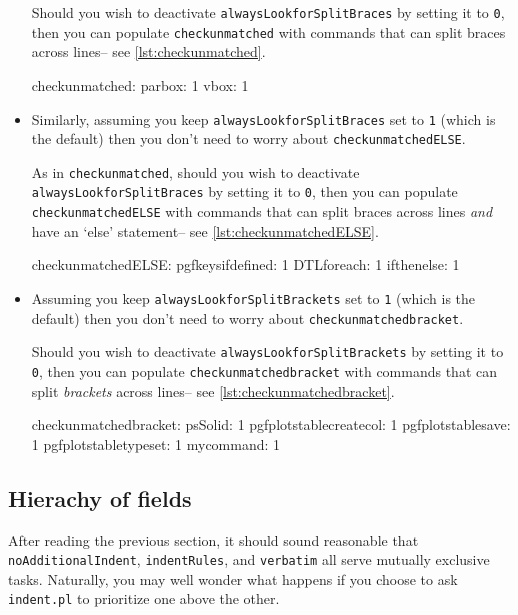 \begin{itemize}
 		Should you wish to deactivate \lstinline!alwaysLookforSplitBraces! by setting it to \lstinline!0!, then 
 		you can populate \lstinline!checkunmatched! with commands that can split braces across 
 		lines-- see \cref{lst:checkunmatched}.
 		 					
 		\begin{yaml}[caption={\lstinline!checkunmatched!},label={lst:checkunmatched}]
checkunmatched:
    parbox: 1
    vbox: 1
 		\end{yaml}
 		\item[\color{red}\verbitem{checkunmatchedELSE}] Similarly, assuming you keep \lstinline!alwaysLookforSplitBraces! set to \lstinline!1! (which
 		is the default) then you don't need to worry about \lstinline!checkunmatchedELSE!. 
 		 					
 		As in \lstinline!checkunmatched!, should you wish to deactivate \lstinline!alwaysLookforSplitBraces! by setting it to \lstinline!0!, then 
 		you can populate \lstinline!checkunmatchedELSE! with commands that can split braces across 
 		lines \emph{and} have an `else' statement-- see \cref{lst:checkunmatchedELSE}.
 		 					
 		\begin{yaml}[caption={\lstinline!checkunmatchedELSE!},label={lst:checkunmatchedELSE}]
checkunmatchedELSE:
    pgfkeysifdefined: 1
    DTLforeach: 1
    ifthenelse: 1
 		\end{yaml}
 		\item[\color{red}\verbitem{checkunmatchedbracket}] Assuming you keep \lstinline!alwaysLookforSplitBrackets! 
 		set to \lstinline!1! (which is the default) then you don't need to worry about \lstinline!checkunmatchedbracket!. 
 		 					
 		Should you wish to deactivate \lstinline!alwaysLookforSplitBrackets! by setting it 
 		to \lstinline!0!, then you can populate \lstinline!checkunmatchedbracket! with commands that can 
 		split \emph{brackets} across lines-- see \cref{lst:checkunmatchedbracket}.
 		 					
 		\begin{yaml}[caption={\lstinline!checkunmatchedbracket!},label={lst:checkunmatchedbracket}]
checkunmatchedbracket:
    psSolid: 1
    pgfplotstablecreatecol: 1
    pgfplotstablesave: 1
    pgfplotstabletypeset: 1
    mycommand: 1
 		\end{yaml}
 	\end{itemize}
 	 	
 \subsection{Hierachy of fields}\label{sec:fieldhierachy}
 	After reading the previous section, it should sound reasonable that 
 	\lstinline!noAdditionalIndent!, \lstinline!indentRules!, and 
 	\lstinline!verbatim! all serve mutually exclusive tasks. Naturally, you may 
 	well wonder what happens if you choose to ask \lstinline!indent.pl! to 
 	prioritize one above the other.
 	 	
